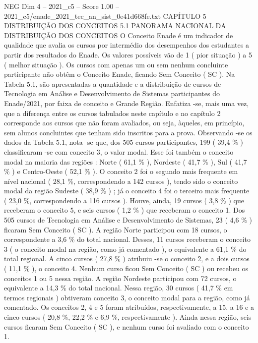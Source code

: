 \begin{textsample}{NEG Dim 4 – 2021\_c5 – Score 1.00 – 2021\_c5/enade\_2021\_tec\_an\_sist\_0e41d668fe.txt}  \label{ex:f4_neg_144}
CAPÍTULO 5 DISTRIBUIÇÃO DOS CONCEITOS 5.1 PANORAMA NACIONAL DA DISTRIBUIÇÃO DOS CONCEITOS O Conceito Enade é um indicador de qualidade que avalia os cursos por intermédio dos desempenhos dos estudantes a partir dos resultados do Enade.
Os valores possíveis vão de 1 ( pior situação ) a 5 ( melhor situação ).
Os cursos com apenas um ou sem nenhum concluinte participante não obtêm o Conceito Enade, ficando Sem Conceito ( SC ).
Na Tabela 5.1, são apresentadas a quantidade e a distribuição de cursos de Tecnologia em Análise e Desenvolvimento de Sistemas participantes do Enade/2021, por faixa de conceito e Grande Região.
Enfatiza -se, mais uma vez, que a diferença entre os cursos tabulados neste capítulo e no capítulo 2 corresponde aos cursos que não foram avaliados, ou seja, àqueles, em princípio, sem alunos concluintes que tenham sido inscritos para a prova.
Observando -se os dados da Tabela 5.1, nota -se que, dos 505 cursos participantes, 199 ( 39,4 \% ) classificaram -se com conceito 3, o valor modal.
Esse foi também o conceito modal na maioria das regiões : Norte ( 61,1 \% ), Nordeste ( 41,7 \% ), Sul ( 41,7 \% ) e Centro-Oeste ( 52,1 \% ).
O conceito 2 foi o segundo mais frequente em nível nacional ( 28,1 \%, correspondendo a 142 cursos ), tendo sido o conceito modal da região Sudeste ( 38,9 \% ) ; já o conceito 4 foi o terceiro mais frequente ( 23,0 \%, correspondendo a 116 cursos ).
Houve, ainda, 19 cursos ( 3,8 \% ) que receberam o conceito 5, e seis cursos ( 1,2 \% ) que receberam o conceito 1.
Dos 505 cursos de Tecnologia em Análise e Desenvolvimento de Sistemas, 23 ( 4,6 \% ) ficaram Sem Conceito ( SC ).
A região Norte participou com 18 cursos, o correspondente a 3,6 \% do total nacional.
Desses, 11 cursos receberam o conceito 3 ( o conceito modal na região, como já comentado ), o equivalente a 61,1 \% do total regional.
A cinco cursos ( 27,8 \% ) atribuiu -se o conceito 2, e a dois cursos ( 11,1 \% ), o conceito 4.
Nenhum curso ficou Sem Conceito ( SC ) ou recebeu os conceitos 1 ou 5 nessa região.
A região Nordeste participou com 72 cursos, o equivalente a 14,3 \% do total nacional.
Nessa região, 30 cursos ( 41,7 \% em termos regionais ) obtiveram conceito 3, o conceito modal para a região, como já comentado.
Os conceitos 2, 4 e 5 foram atribuídos, respectivamente, a 15, a 16 e a cinco cursos ( 20,8 \%, 22,2 \% e 6,9 \%, respectivamente ).
Ainda nessa região, seis cursos ficaram Sem Conceito ( SC ), e nenhum curso foi avaliado com o conceito 1.

\end{textsample}
